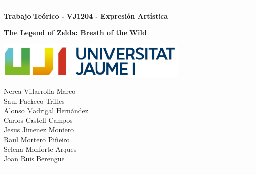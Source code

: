 \documentclass[12pt]{article}
\date{}
\begin{document}
    \begin{titlepage}

        \centering
        \hrule
        \vspace{1cm}
        {\bfseries\huge Trabajo Teórico - VJ1204 - Expresión Artística \par}
        \vspace{1cm}
        {\bfseries\huge The Legend of Zelda: Breath of the Wild \par}
        \vspace{3cm}
        {\includegraphics[width=0.7\textwidth]{images/UJI_logo.jpg} \par}
        \vspace{4cm}

        {\large
        Nerea Villarrolla Marco \\
        Saul Pacheco Trilles \\
        Alonso Madrigal Hernández \\
        Carlos Castell Campos \\
        Jesus Jimenez Montero \\
        Raul Montero Piñeiro \\
        Selena Monforte Arques \\
        Joan Ruiz Berengue \\
        \par}
        \vspace{10cm}
        \hrule

    \end{titlepage}

\newpage
\begin{abstract}
    En el siguiente documento hablaremos sobre las bases artísticas del videojuego "The Legend Of Zelda: Breath of the wild". Tanto del director de concept art como un atisbo de información sobre el juego. Finalemnete acabaremos con el analisis artistico profundo de varios fan arts.

\end{abstract}
\end{document}
